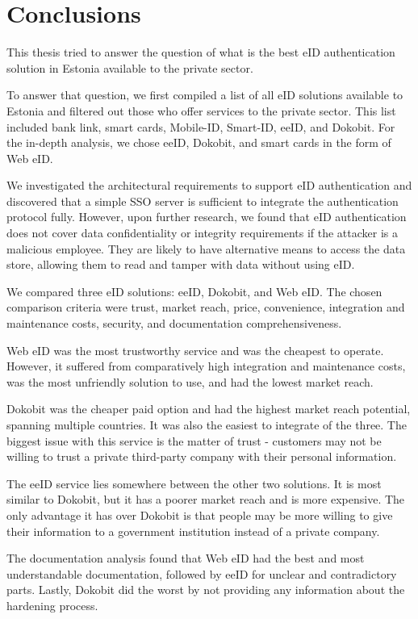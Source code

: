 \section{Conclusions}

This thesis tried to answer the question of what is the best eID authentication solution in Estonia available to the private sector.

To answer that question, we first compiled a list of all eID solutions available to Estonia and filtered out those who offer services to the private sector. This list included {bank link}, smart cards, Mobile-ID, Smart-ID, eeID, and Dokobit. For the in-depth analysis, we chose eeID, Dokobit, and smart cards in the form of Web eID.

We investigated the architectural requirements to support eID authentication and discovered that a simple SSO server is sufficient to integrate the authentication protocol fully. However, upon further research, we found that eID authentication does not cover data confidentiality or integrity requirements if the attacker is a malicious employee. They are likely to have alternative means to access the data store, allowing them to read and tamper with data without using eID.

We compared three eID solutions: eeID, Dokobit, and Web eID. The chosen comparison criteria were trust, market reach, price, convenience, integration and maintenance costs, security, and documentation comprehensiveness.

Web eID was the most trustworthy service and was the cheapest to operate. However, it suffered from comparatively high integration and maintenance costs, was the most unfriendly solution to use, and had the lowest market reach.

Dokobit was the cheaper paid option and had the highest market reach potential, spanning multiple countries. It was also the easiest to integrate of the three. The biggest issue with this service is the matter of trust - customers may not be willing to trust a private third-party company with their personal information.

The eeID service lies somewhere between the other two solutions. It is most similar to Dokobit, but it has a poorer market reach and is more expensive. The only advantage it has over Dokobit is that people may be more willing to give their information to a government institution instead of a private company.

The documentation analysis found that Web eID had the best and most understandable documentation, followed by eeID for unclear and contradictory parts. Lastly, Dokobit did the worst by not providing any information about the hardening process.

